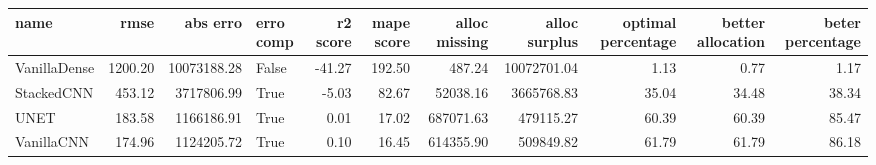 \begin{tabular}{lrrlrrrrrrr}
\toprule
name & rmse & abs erro & erro comp & r2 score & mape score & alloc missing & alloc surplus & optimal percentage & better allocation & beter percentage \\
\midrule
VanillaDense & 1200.20 & 10073188.28 & False & -41.27 & 192.50 & 487.24 & 10072701.04 & 1.13 & 0.77 & 1.17 \\
StackedCNN & 453.12 & 3717806.99 & True & -5.03 & 82.67 & 52038.16 & 3665768.83 & 35.04 & 34.48 & 38.34 \\
UNET & 183.58 & 1166186.91 & True & 0.01 & 17.02 & 687071.63 & 479115.27 & 60.39 & 60.39 & 85.47 \\
VanillaCNN & 174.96 & 1124205.72 & True & 0.10 & 16.45 & 614355.90 & 509849.82 & 61.79 & 61.79 & 86.18 \\
\bottomrule
\end{tabular}
